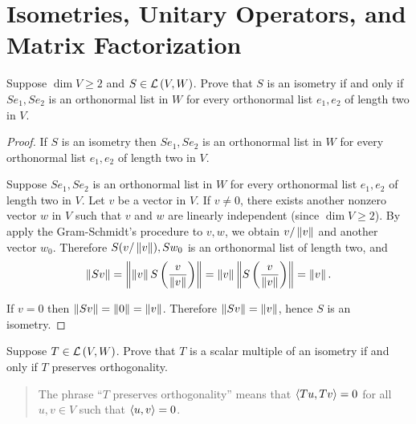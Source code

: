 \section{Isometries, Unitary Operators, and Matrix Factorization}

\begin{exercise}
    Suppose $\dim V \geq 2$ and $S \in \mathcal{L}\left({V, W}\right)$. Prove that $S$ is an isometry if and only if $Se_{1}, Se_{2}$ is an orthonormal list in $W$ for every orthonormal list $e_{1}, e_{2}$ of length two in $V$.
\end{exercise}

\begin{proof}
    If $S$ is an isometry then $Se_{1}, Se_{2}$ is an orthonormal list in $W$ for every orthonormal list $e_{1}, e_{2}$ of length two in $V$.

    \bigskip
    Suppose $Se_{1}, Se_{2}$ is an orthonormal list in $W$ for every orthonormal list $e_{1}, e_{2}$ of length two in $V$. Let $v$ be a vector in $V$. If $v\ne 0$, there exists another nonzero vector $w$ in $V$ such that $v$ and $w$ are linearly independent (since $\dim V\geq 2$). By apply the Gram-Schmidt's procedure to $v, w$, we obtain $v/\left\Vert{v}\right\Vert$ and another vector $w_{0}$. Therefore $S(v/\left\Vert{v}\right\Vert), Sw_{0}$ is an orthonormal list of length two, and
    \[
        \left\Vert{Sv}\right\Vert = \left\Vert{\left\Vert{v}\right\Vert S\left(\frac{v}{\left\Vert{v}\right\Vert}\right)}\right\Vert = \left\Vert{v}\right\Vert\left\Vert{S\left(\frac{v}{\left\Vert{v}\right\Vert}\right)}\right\Vert = \left\Vert{v}\right\Vert.
    \]

    If $v = 0$ then $\left\Vert{Sv}\right\Vert = \left\Vert{0}\right\Vert = \left\Vert{v}\right\Vert$. Therefore $\left\Vert{Sv}\right\Vert = \left\Vert{v}\right\Vert$, hence $S$ is an isometry.
\end{proof}
\newpage

\begin{exercise}
    Suppose $T \in \mathcal{L}\left({V, W}\right)$. Prove that $T$ is a scalar multiple of an isometry if and only if $T$ preserves orthogonality.
\end{exercise}

\begin{quote}
    The phrase ``$T$ preserves orthogonality'' means that $\left\langle{Tu, Tv}\right\rangle = 0$ for all $u, v \in V$ such that $\left\langle{u, v}\right\rangle = 0$.
\end{quote}

